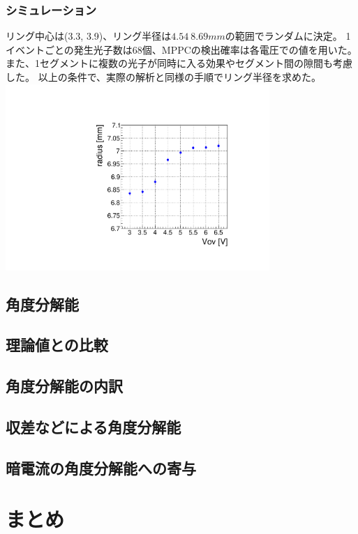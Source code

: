 \documentclass[uplatex, titlepage, dvipdfmx, 12pt, a4paper]{jsreport}
\begin{document}
    \subsection{シミュレーション}
    リング中心は(3.3, 3.9)、リング半径は$4.54~8.69 mm$の範囲でランダムに決定。
    1イベントごとの発生光子数は68個、MPPCの検出確率は各電圧での値を用いた。
    また、1セグメントに複数の光子が同時に入る効果やセグメント間の隙間も考慮した。
    以上の条件で、実際の解析と同様の手順でリング半径を求めた。
    \includegraphics[width=10cm, pagebox=cropbox, clip]{image/radius_simulation.pdf}
    

  \section{角度分解能}

  \section{理論値との比較}

  \section{角度分解能の内訳}

  \section{収差などによる角度分解能}

  \section{暗電流の角度分解能への寄与}

\chapter{まとめ}
\end{document}
